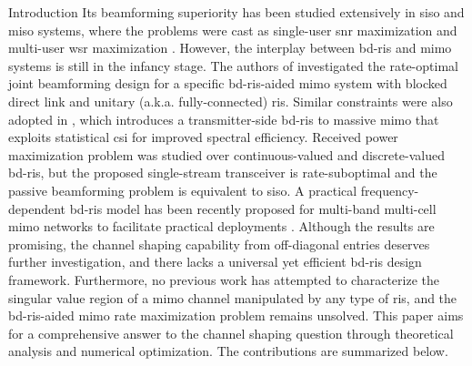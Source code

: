 \begin{section}{Introduction}
	Its beamforming superiority has been studied extensively in \gls{siso} and \gls{miso} systems, where the problems were cast as single-user \gls{snr} maximization \cite{Shen2020a,Nerini2023,Nerini2024,Santamaria2023} and multi-user \gls{wsr} maximization \cite{Fang2023,Zhou2023,Li2023c,Soleymani2024}.
	However, the interplay between \gls{bd}-\gls{ris} and \gls{mimo} systems is still in the infancy stage.
	The authors of \cite{Bartoli2023} investigated the rate-optimal joint beamforming design for a specific \gls{bd}-\gls{ris}-aided \gls{mimo} system with blocked direct link and unitary (a.k.a. fully-connected) \gls{ris}.
	Similar constraints were also adopted in \cite{Mishra2024}, which introduces a transmitter-side \gls{bd}-\gls{ris} to massive \gls{mimo} that exploits statistical \gls{csi} for improved spectral efficiency.
	Received power maximization problem was studied over continuous-valued \cite{Nerini2023} and discrete-valued \cite{Nerini2023b} \gls{bd}-\gls{ris}, but the proposed single-stream transceiver is rate-suboptimal and the passive beamforming problem is equivalent to \gls{siso}.
	A practical frequency-dependent \gls{bd}-\gls{ris} model has been recently proposed for multi-band multi-cell \gls{mimo} networks to facilitate practical deployments \cite{Sena2024}.
	Although the results are promising, the channel shaping capability from off-diagonal entries deserves further investigation, and there lacks a universal yet efficient \gls{bd}-\gls{ris} design framework.
	Furthermore, no previous work has attempted to characterize the singular value region of a \gls{mimo} channel manipulated by any type of \gls{ris}, and the \gls{bd}-\gls{ris}-aided \gls{mimo} rate maximization problem remains unsolved.
	This paper aims for a comprehensive answer to the channel shaping question through theoretical analysis and numerical optimization.
	The contributions are summarized below.




\end{section}
